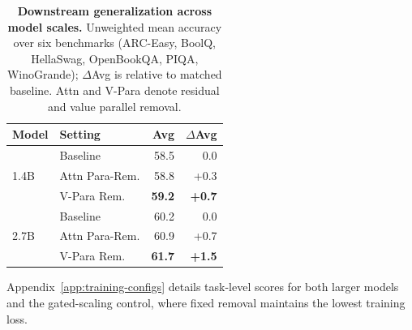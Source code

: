 \begin{table}[t]
  \caption{\textbf{Downstream generalization across model scales.}
  Unweighted mean accuracy over six benchmarks (ARC-Easy, BoolQ, HellaSwag,
  OpenBookQA, PIQA, WinoGrande); \(\Delta\)Avg is relative to matched baseline.
  Attn and V-Para denote residual and value parallel removal.}
  \label{tab:pretraining-summary}
  \centering
  \small
  \renewcommand{\arraystretch}{0.96}
  \begin{tabular*}{0.92\columnwidth}{@{\extracolsep{\fill}}llrr}
    \toprule
    Model & Setting & Avg & $\Delta$Avg \\
    \midrule
    \multirow{3}{*}{1.4B}
      & Baseline & 58.5 & 0.0 \\
      & Attn Para-Rem. & 58.8 & +0.3 \\
      & V-Para Rem. & \textbf{59.2} & \textbf{+0.7} \\
    \midrule
    \multirow{3}{*}{2.7B}
      & Baseline & 60.2 & 0.0 \\
      & Attn Para-Rem. & 60.9 & +0.7 \\
      & V-Para Rem. & \textbf{61.7} & \textbf{+1.5} \\
    \bottomrule
  \end{tabular*}
\end{table}

Appendix~\ref{app:training-configs} details task-level scores for both larger
models and the gated-scaling control, where fixed removal maintains the lowest
training loss.

